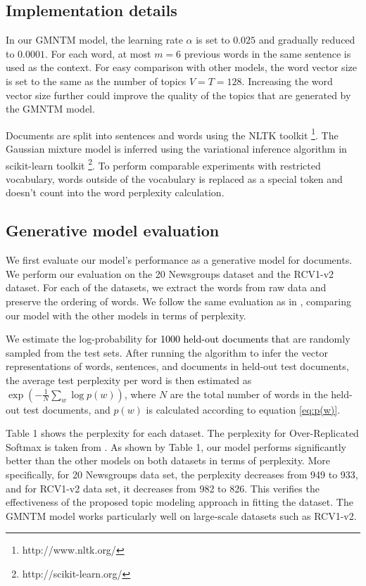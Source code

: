 \documentclass[english,letter]{article}
\renewcommand\[{\begin{equation}}
\renewcommand\]{\end{equation}}
\begin{document}
\subsection{Implementation details}

In our GMNTM model, the learning rate $\alpha$ is set to $0.025$
and gradually reduced to $0.0001$. For each word, at most $m=6$
previous words in the same sentence is used as the context. For easy
comparison with other models, the word vector size is set to the same
as the number of topics $V=T=128$. Increasing the word vector size
further could improve the quality of the topics that are generated
by the GMNTM model.

Documents are split into sentences and words using the NLTK toolkit
\cite{bird2006nltk}%
\footnote{http://www.nltk.org/%
}. The Gaussian mixture model is inferred using the variational inference
algorithm in scikit-learn toolkit \cite{pedregosa2011scikit}%
\footnote{http://scikit-learn.org/%
}. To perform comparable experiments with restricted vocabulary, words
outside of the vocabulary is replaced as a special token and doesn't
count into the word perplexity calculation.


\subsection{Generative model evaluation}

We first evaluate our model's performance as a generative model for
documents. We perform our evaluation on the 20 Newsgroups dataset
and the RCV1-v2 dataset. For each of the datasets, we extract the
words from raw data and preserve the ordering of words. We follow
the same evaluation as in \cite{srivastava2013modeling}, comparing
our model with the other models in terms of perplexity.

We estimate the log-probability fo\textcolor{black}{r 1000 held-out
documents tha}t are randomly sampled from the test sets. After running
the algorithm to infer the vector representations of words, sentences,
and documents in held-out test documents, the average test perplexity
per word is then estimated as $\exp\left(-\frac{1}{N}\sum_{w}\log p(w)\right)$,
where $N$ are the total number of words in the held-out test documents,
and $p(w)$ is calculated according to equation \eqref{eq:p(w)}.

Table 1 shows the perplexity for each dataset. The perplexity for
Over-Replicated Softmax is taken from \cite{srivastava2013modeling}.
As shown by Table 1, our model performs significantly better than
the other models on both datasets in terms of perplexity. More specifically,
for 20 Newsgroups data set, the perplexity decreases from 949 to 933,
and for RCV1-v2 data set, it decreases from 982 to 826. This verifies
the effectiveness of the proposed topic modeling approach in fitting
the dataset. The GMNTM model works particularly well on large-scale
datasets such as RCV1-v2.
\end{document}
